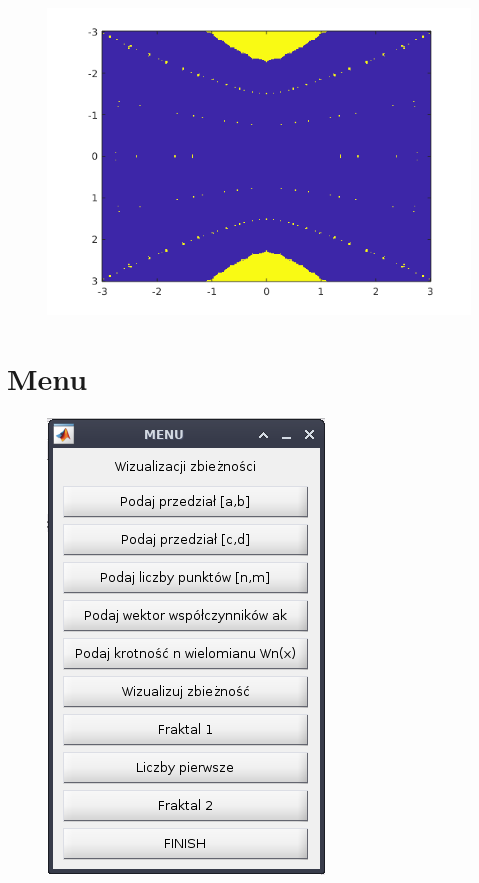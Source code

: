 \documentclass[10pt]{article}   %
\begin{document}
\begin{figure}[ht]
\begin{center}
\advance\leftskip-3cm
\advance\rightskip-3cm
\includegraphics[keepaspectratio=true,scale=0.8]{map4.png}\newline
\end{center}\end{figure}
\newpage


\section{Menu}
\begin{figure}[ht]
\begin{center}
\advance\leftskip-3cm
\advance\rightskip-3cm
\includegraphics[keepaspectratio=true,scale=0.6]{menu1.png}

\end{center}\end{figure}
\newpage
\end{document}
